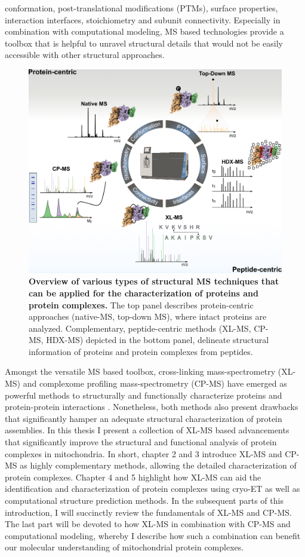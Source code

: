 conformation, post-translational modifications (PTMs), surface properties, interaction interfaces, stoichiometry and subunit connectivity. Especially in combination with computational modeling, MS based technologies provide a toolbox that is helpful to unravel structural details that would not be easily accessible with other structural approaches.

\begin{figure}[hbt]
    \center
    \includegraphics[]{Chapter.1/Figures/Figure1.png}
    \caption{\textbf{Overview of various types of structural MS techniques that can be applied for the characterization of proteins and protein complexes.} The top panel describes protein-centric approaches (native-MS, top-down MS), where intact proteins are analyzed. Complementary, peptide-centric methods (XL-MS, CP-MS, HDX-MS) depicted in the bottom panel, delineate structural information of proteins and protein complexes from peptides.}
    \label{fig:fig1}
\end{figure} \clearpage
Amongst the versatile MS based toolbox, cross-linking mass-spectrometry (XL-MS) and complexome profiling mass-spectrometry (CP-MS) have emerged as powerful methods to structurally and functionally characterize proteins and protein-protein interactions \cite{Steigenberger_2020}. Nonetheless, both methods also present drawbacks that significantly hamper an adequate structural characterization of protein assemblies. In this thesis I present a collection of XL-MS based advancements that significantly improve the structural and functional analysis of protein complexes in mitochondria. In short, chapter 2 and 3 introduce XL-MS and CP-MS as highly complementary methods, allowing the detailed characterization of protein complexes. Chapter 4 and 5 highlight how XL-MS can aid the identification and characterization of protein complexes using cryo-ET as well as computational structure prediction methods. In the subsequent parts of this introduction, I will succinctly review the fundamentals of XL-MS and CP-MS. The last part will be devoted to how XL-MS in combination with CP-MS and computational modeling, whereby I describe how such a combination can benefit our molecular understanding of mitochondrial protein complexes.
%
